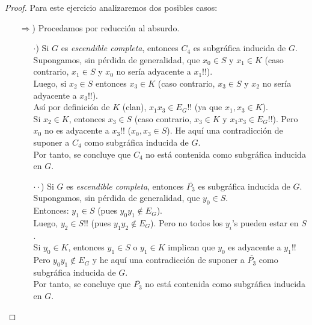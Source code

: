 \documentclass{article}
\begin{document}
\begin{enumerate}
\begin{proof}
      Para este ejercicio analizaremos dos posibles casos:
      \begin{itemize}
        \item[$\Rightarrow$)] Procedamos por reducción al absurdo.
          \begin{itemize}
            \item[$\cdot$)] Si $G$ es \textit{escendible completa}, entonces $C_4$ es
              subgr\'afica inducida de $G$. \\
              Supongamos, sin p\'erdida de generalidad, que $x_0 \in S$ y $x_1 \in K$
              (caso contrario, $x_1 \in S$ y $x_0$ no ser\'ia adyacente a $x_1$!!). \\
              Luego, si $x_2 \in S$ entonces $x_3 \in K$ (caso contrario, $x_3 \in S$
              y $x_2$ no ser\'ia adyacente a $x_3$!!). \\
              As\'i por definici\'on de $K$ (clan), $x_1 x_3 \in E_G$!!
              (ya que $x_1, x_3 \in K$). \\
              Si $x_2 \in K$, entonces $x_3 \in S$ (caso contrario, $x_3 \in K$ y
              $x_1 x_3 \in E_G$!!). Pero $x_0$ no es adyacente a $x_3$!! ($x_0, x_3
              \in S$). He aqu\'i una contradicci\'on de suponer a $C_4$ como subgr\'afica
              inducida de $G$. \\
              Por tanto, se concluye que $C_4$ no est\'a contenida como subgr\'afica
              inducida en $G$. \\

            \item[$\cdot\cdot$)] Si $G$ es \textit{escendible completa}, entonces
              $\overline{P_3}$ es subgr\'afica inducida de $G$. \\
              Supongamos, sin pérdida de generalidad, que $y_0 \in S$. \\
              Entonces: $y_1 \in S$ (pues $y_0 y_1 \notin E_G$). \\
              Luego, $y_2 \in S$!! (pues $y_1 y_2 \notin E_G$). Pero no todos los $y_i$'s
              pueden estar en $S$. \\
              Si $y_0 \in K$, entonces $y_1 \in S$ o $y_1 \in K$ implican que $y_0$ es
              adyacente a $y_1$!! \\
              Pero $y_0 y_1 \notin E_G$ y he aqu\'i una contradicci\'on de suponer a
              $\overline{P_3}$
              como subgr\'afica inducida de $G$. \\
              Por tanto, se concluye que $\overline{P_3}$ no est\'a contenida como
              subgr\'afica inducida en $G$. \\
          \end{itemize}


\end{itemize}
\end{proof}
\end{enumerate}
\end{document}
